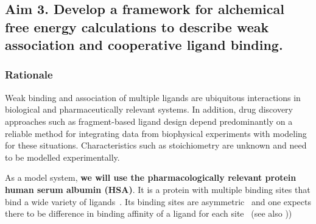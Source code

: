 \documentclass[10pt,final]{article}
\begin{document}

\subsection*{Aim 3. Develop a framework for alchemical free energy calculations to describe weak association and cooperative ligand binding.}
\subsubsection*{Rationale}
Weak binding and association of multiple ligands are ubiquitous interactions in biological and pharmaceutically relevant systems.
In addition, drug discovery approaches such as fragment-based ligand design depend predominantly on a reliable method for integrating data from biophysical experiments with modeling for these situations. Characteristics such as stoichiometry are unknown and need to be modelled experimentally.



As a model system, \textbf{we will use the pharmacologically relevant protein human serum albumin (HSA)}. It is a protein with multiple binding sites that bind a wide variety of ligands~\cite{He1992a,Kragh-Hansen2002a,Sulkowska2002a}. Its binding sites are asymmetric~\cite{He1992a, Curry1998a} and one expects there to be difference in binding affinity of a ligand for each site~\cite{Sudlow1976a} (see also ))
\end{document}
